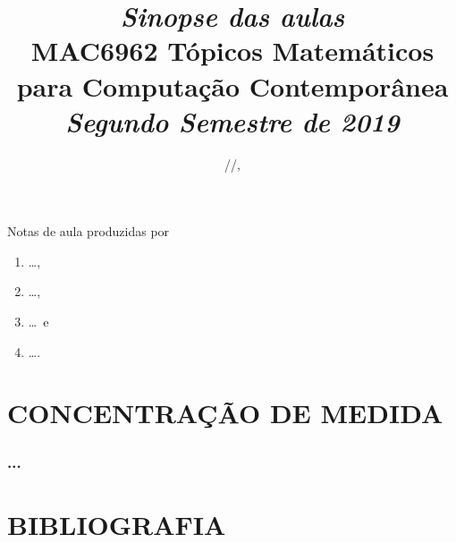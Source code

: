 


\linenumbers

\title[MAC6962 Tópicos Matemáticos para Computação Contemporânea]{%
{\small\sl Sinopse das aulas}\\\bigskip
MAC6962 Tópicos Matemáticos para Computação Contemporânea\\\bigskip
{\it Segundo Semestre de 2019}
}

\address{Instituto de Matemática e Estatística, Universidade de São
  Paulo, Rua do Matão 1010, 05508--090~São Paulo, SP}


\yyyymmdddate
\shortdate
\def\today{\number\year/\number\month/\number\day}
\date{\today, \currenttime}
\footskip=28pt


\maketitle

\section*{}
\label{sec:prefacio}
\doublespace
Notas de aula produzidas por
\begin{enumerate}[label=\nplain]
\item \dots,
\item \dots,
\item \dots\ e
\item \dots.
\end{enumerate}

\endgroup
\newpage\onehalfspace
\tableofcontents
\pagestyle{fancy}

\endgroup
\doublespace

\newpage
\part{CONCENTRAÇÃO DE MEDIDA}

\section{...}
\label{...}



\newpage
\part{BIBLIOGRAFIA}

%


\endgroup



